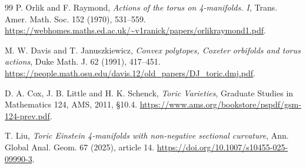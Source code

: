\documentclass[UTF8,a4paper,11pt,fontset=fandol]{ctexart}
\numberwithin{equation}{section}
\theoremstyle{definition}
\begin{document}
\begin{thebibliography}{99}
 P. Orlik and F. Raymond,
\emph{Actions of the torus on 4-manifolds. I}, Trans. Amer. Math. Soc. 152 (1970), 531--559.
\url{https://webhomes.maths.ed.ac.uk/~v1ranick/papers/orlikraymond1.pdf}.

 M. W. Davis and T. Januszkiewicz,
\emph{Convex polytopes, Coxeter orbifolds and torus actions}, Duke Math. J. 62 (1991), 417--451.
\url{https://people.math.osu.edu/davis.12/old_papers/DJ_toric.dmj.pdf}.

 D. A. Cox, J. B. Little and H. K. Schenck,
\emph{Toric Varieties}, Graduate Studies in Mathematics 124, AMS, 2011, \S10.4.
\url{https://www.ams.org/bookstore/pspdf/gsm-124-prev.pdf}.

 T. Liu,
\emph{Toric Einstein 4-manifolds with non-negative sectional curvature},
Ann. Global Anal. Geom. 67 (2025), article 14.
\url{https://doi.org/10.1007/s10455-025-09990-3}.

\end{thebibliography}
\end{document}
